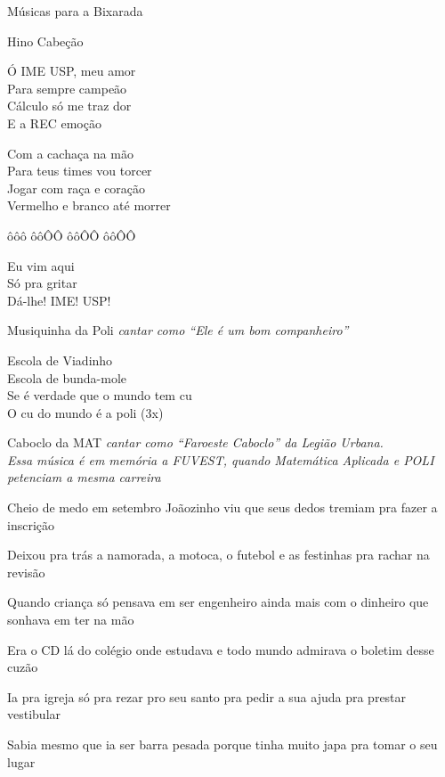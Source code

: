 \begin{secao}{Músicas para a Bixarada}
\begin{subsecao}{Hino Cabeção}

Ó IME USP, meu amor\\
Para sempre campeão\\
Cálculo só me traz dor\\
E a REC emoção

Com a cachaça na mão\\
Para teus times vou torcer\\
Jogar com raça e coração\\
Vermelho e branco até morrer

ôôô ôôÔÔ ôôÔÔ ôôÔÔ

Eu vim aqui\\
Só pra gritar\\
Dá-lhe! IME! USP!
\end{subsecao}

\begin{subsecao}{Musiquinha da Poli}
{\em cantar como ``Ele é um bom companheiro''}

Escola de Viadinho \\
Escola de bunda-mole \\
Se é verdade que o mundo tem cu \\
O cu do mundo é a poli  (3x)
\end{subsecao}

\begin{subsecao}{Caboclo da MAT}
{\em cantar como ``Faroeste Caboclo'' da Legião Urbana.}\\
{\em Essa música é em memória a FUVEST, quando Matemática Aplicada e POLI 
petenciam a mesma carreira}

Cheio de medo em setembro Joãozinho viu que seus dedos tremiam pra fazer a
inscrição

Deixou pra trás a namorada, a motoca, o futebol e as festinhas pra rachar na
revisão

Quando criança só pensava em ser engenheiro ainda mais com o dinheiro que
sonhava em ter na mão

Era o CD lá do colégio onde estudava e todo mundo admirava o boletim desse
cuzão

Ia pra igreja só pra rezar pro seu santo pra pedir a sua ajuda pra prestar
vestibular

Sabia mesmo que ia ser barra pesada porque tinha muito japa pra tomar o seu
lugar


\end{subsecao}
\end{secao}
